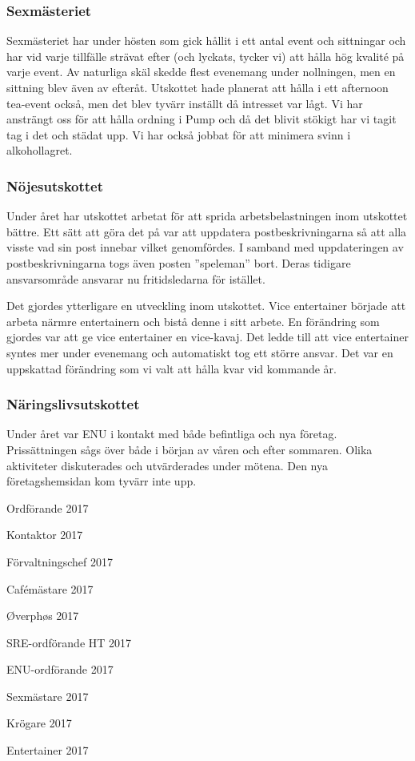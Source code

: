 \documentclass[../_main/handlingar.tex]{subfiles}
\begin{document}
\subsubsection*{Sexmästeriet}
Sexmästeriet har under hösten som gick hållit i ett antal event och sittningar och har vid varje tillfälle strävat efter (och lyckats, tycker vi) att hålla hög kvalité på varje event. Av naturliga skäl skedde flest evenemang under nollningen, men en sittning blev även av efteråt. Utskottet hade planerat att hålla i ett afternoon tea-event också, men det blev tyvärr inställt då intresset var lågt. Vi har ansträngt oss för att hålla ordning i Pump och då det blivit stökigt har vi tagit tag i det och städat upp. Vi har också jobbat för att minimera svinn i alkohollagret.

\subsubsection*{Nöjesutskottet}
Under året har utskottet arbetat för att sprida arbetsbelastningen inom utskottet bättre. Ett sätt att göra det på var att uppdatera postbeskrivningarna så att alla visste vad sin post innebar vilket genomfördes. I samband med uppdateringen av postbeskrivningarna togs även posten ”speleman” bort. Deras tidigare ansvarsområde ansvarar nu fritidsledarna för istället.

Det gjordes ytterligare en utveckling inom utskottet. Vice entertainer började att arbeta närmre entertainern och bistå denne i sitt arbete. En förändring som gjordes var att ge vice entertainer en vice-kavaj. Det ledde till att vice entertainer syntes mer under evenemang och automatiskt tog ett större ansvar. Det var en uppskattad förändring som vi valt att hålla kvar vid kommande år.

\subsubsection*{Näringslivsutskottet}
Under året var ENU i kontakt med både befintliga och nya företag. Prissättningen sågs över både i början av våren och efter sommaren. Olika aktiviteter diskuterades och utvärderades under mötena. Den nya företagshemsidan kom tyvärr inte upp.

\newpage
\begin{signatures}{10}
    \mvh
    \signature{Erik Månsson}{Ordförande 2017}
    \signature{Johan Karlberg}{Kontaktor 2017}
    \signature{Sophia Grimmeiss Grahm}{Förvaltningschef 2017}
    \signature{Daniel Bakic}{Cafémästare 2017}
    \signature{Niklas Gustafson}{Øverphøs 2017}
    \signature{Edvard Carlsson}{SRE-ordförande HT 2017}
    \signature{Josefine Sandström}{ENU-ordförande 2017}
    \signature{Linnea Sjödahl}{Sexmästare 2017}
    \signature{Markus Rahne}{Krögare 2017}
    \signature{Albin Nyström Eklund}{Entertainer 2017}
\end{signatures}
\end{document}
